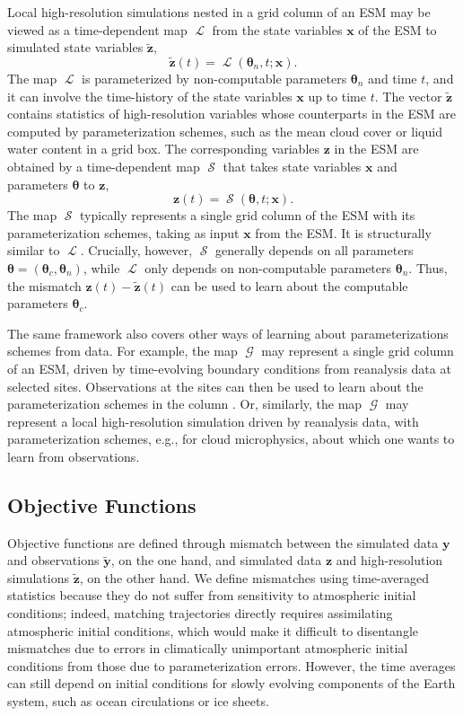 \documentclass[draft]{agujournal}
\renewcommand{\vec}[1]{\boldsymbol{{#1}}}
\newcommand{\cG}{\mathop{\mathcal{G}}}
\newcommand{\cL}{\mathop{\mathcal{L}}}
\newcommand{\cS}{\mathop{\mathcal{S}}}
\begin{document}
Local high-resolution simulations nested in a grid column of an ESM may be viewed as a time-dependent map $\cL$ from the state variables $\vec{x}$ of the ESM to simulated state variables $\vec{\tilde z}$,
\begin{equation}
\vec{\tilde z}(t) = \cL(\vec{\theta}_n,t; \vec{x}).
\end{equation}
The map $\cL$ is parameterized by non-computable parameters $\vec{\theta}_n$ and time $t$, and it can involve the time-history of the state variables $\vec{x}$ up to time $t$. The vector $\vec{\tilde z}$ contains statistics of high-resolution variables whose counterparts in the ESM are computed by parameterization schemes, such as the mean cloud cover or liquid water content in a grid box. The corresponding variables $\vec{z}$ in the ESM are obtained by a time-dependent map $\cS$ that takes state variables $\vec{x}$ and parameters $\vec{\theta}$ to $\vec{z}$,
\begin{equation}
\vec{z}(t) = \cS(\vec{\theta},t; \vec{x}).
\end{equation}
The map $\cS$ typically represents a single grid column of the ESM with its parameterization schemes, taking as input $\vec{x}$ from the ESM. It is structurally similar to $\cL$. Crucially, however, $\cS$ generally depends on all parameters $\vec{\theta}=(\vec{\theta}_c, \vec{\theta}_n)$, while $\cL$ only depends on non-computable parameters $\vec{\theta}_n$. Thus, the mismatch $\vec{z}(t) - \vec{\tilde z}(t)$ can be used to learn about the computable parameters $\vec{\theta}_c$.

The same framework also covers other ways of learning about parameterizations schemes from data. For example, the map $\cG$ may represent a single grid column of an ESM, driven by time-evolving boundary conditions from reanalysis data at selected sites. Observations at the sites can then be used to learn about the parameterization schemes in the column \citep{Neggers12a}. Or, similarly, the map $\cG$ may represent a local high-resolution simulation driven by reanalysis data, with parameterization schemes, e.g., for cloud microphysics, about which one wants to learn from observations. 

\subsection{Objective Functions}

Objective functions are defined through mismatch between the simulated data $\vec{y}$ and observations $\vec{\tilde y}$, on the one hand, and simulated data $\vec{z}$ and high-resolution simulations $\vec{\tilde z}$, on the other hand. We define mismatches using time-averaged statistics because they do not suffer from sensitivity to atmospheric initial conditions; indeed, matching trajectories directly requires assimilating atmospheric initial conditions, which would make it difficult to disentangle mismatches due to errors in climatically unimportant atmospheric initial conditions from those due to parameterization errors. However, the time averages can still depend on initial conditions for slowly evolving components of the Earth system, such as ocean circulations or ice sheets.
\end{document}
